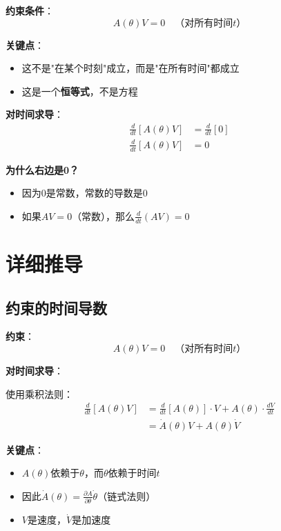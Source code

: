\documentclass[12pt,a4paper]{article}
\begin{document}
\textbf{约束条件}：
\begin{equation}
A(\theta)V = 0 \quad \text{（对所有时间$t$）}
\end{equation}

\textbf{关键点}：
\begin{itemize}
\item 这不是"在某个时刻"成立，而是"在所有时间"都成立
\item 这是一个\textbf{恒等式}，不是方程
\end{itemize}

\textbf{对时间求导}：
\begin{align}
\frac{d}{dt}[A(\theta)V] &= \frac{d}{dt}[0] \\
\frac{d}{dt}[A(\theta)V] &= 0
\end{align}

\textbf{为什么右边是0？}
\begin{itemize}
\item 因为$0$是常数，常数的导数是$0$
\item 如果$AV = 0$（常数），那么$\frac{d}{dt}(AV) = 0$
\end{itemize}

\section{详细推导}

\subsection{约束的时间导数}

\textbf{约束}：
\begin{equation}
A(\theta)V = 0 \quad \text{（对所有时间$t$）} \tag{1}
\end{equation}

\textbf{对时间求导}：

使用乘积法则：
\begin{align}
\frac{d}{dt}[A(\theta)V] &= \frac{d}{dt}[A(\theta)] \cdot V + A(\theta) \cdot \frac{dV}{dt} \\
&= \dot{A}(\theta)V + A(\theta)\dot{V}
\end{align}

\textbf{关键点}：
\begin{itemize}
\item $A(\theta)$依赖于$\theta$，而$\theta$依赖于时间$t$
\item 因此$\dot{A}(\theta) = \frac{\partial A}{\partial \theta}\dot{\theta}$（链式法则）
\item $V$是速度，$\dot{V}$是加速度
\end{itemize}
\end{document}
